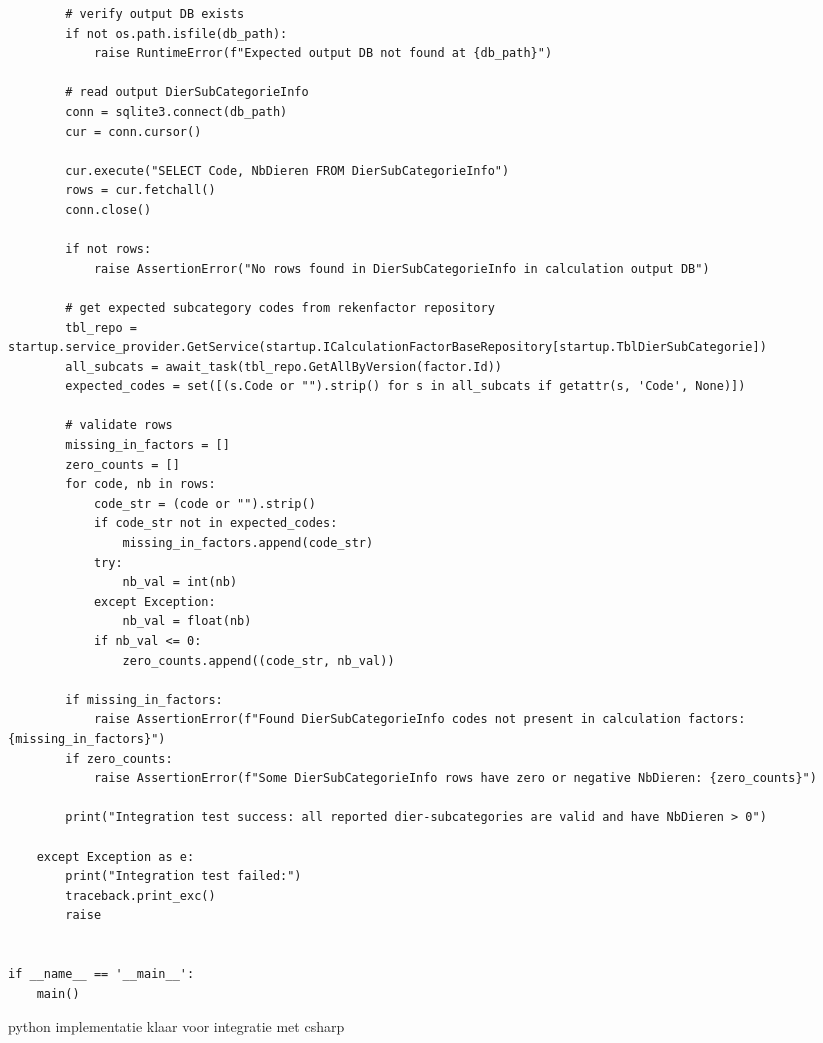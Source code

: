 \begin{verbatim}
        # verify output DB exists
        if not os.path.isfile(db_path):
            raise RuntimeError(f"Expected output DB not found at {db_path}")

        # read output DierSubCategorieInfo
        conn = sqlite3.connect(db_path)
        cur = conn.cursor()

        cur.execute("SELECT Code, NbDieren FROM DierSubCategorieInfo")
        rows = cur.fetchall()
        conn.close()

        if not rows:
            raise AssertionError("No rows found in DierSubCategorieInfo in calculation output DB")

        # get expected subcategory codes from rekenfactor repository
        tbl_repo = startup.service_provider.GetService(startup.ICalculationFactorBaseRepository[startup.TblDierSubCategorie])
        all_subcats = await_task(tbl_repo.GetAllByVersion(factor.Id))
        expected_codes = set([(s.Code or "").strip() for s in all_subcats if getattr(s, 'Code', None)])

        # validate rows
        missing_in_factors = []
        zero_counts = []
        for code, nb in rows:
            code_str = (code or "").strip()
            if code_str not in expected_codes:
                missing_in_factors.append(code_str)
            try:
                nb_val = int(nb)
            except Exception:
                nb_val = float(nb)
            if nb_val <= 0:
                zero_counts.append((code_str, nb_val))

        if missing_in_factors:
            raise AssertionError(f"Found DierSubCategorieInfo codes not present in calculation factors: {missing_in_factors}")
        if zero_counts:
            raise AssertionError(f"Some DierSubCategorieInfo rows have zero or negative NbDieren: {zero_counts}")

        print("Integration test success: all reported dier-subcategories are valid and have NbDieren > 0")

    except Exception as e:
        print("Integration test failed:")
        traceback.print_exc()
        raise


if __name__ == '__main__':
    main()

  \end{verbatim}
 \begin{listing}[H]
  \caption[bereken emissie voedertechnieken]{python implementatie klaar voor integratie met csharp}
  \label{lst:berekenvoederemissiepython}
\end{listing}

